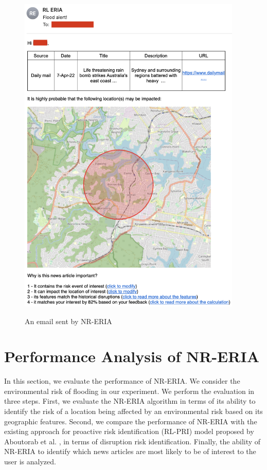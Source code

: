 \documentclass[]{ceurart}
\begin{document}
\begin{figure}[hbt!]
  \begin{center}
  \includegraphics[width=4.2in]{photo/email.png}\\
  \caption{An email sent by NR-ERIA }\label{RL-ERIA email}
  \end{center}
  \vspace{-0.2in}
\end{figure}

\section{Performance Analysis of NR-ERIA}

In this section, we evaluate the performance of NR-ERIA. We consider the environmental risk of flooding in our experiment. We perform the evaluation in three steps. First, we evaluate the NR-ERIA algorithm in terms of its ability to identify the risk of a location being affected by an environmental risk based on its geographic features. 
Second, we compare the performance of NR-ERIA with the existing approach for proactive risk identification (RL-PRI) model proposed by Aboutorab et al. \cite{aboutorab2021reinforcement}, in terms of disruption risk identification. Finally, the ability of NR-ERIA to identify which news articles are most likely to be of interest to the user is analyzed.
\end{document}
